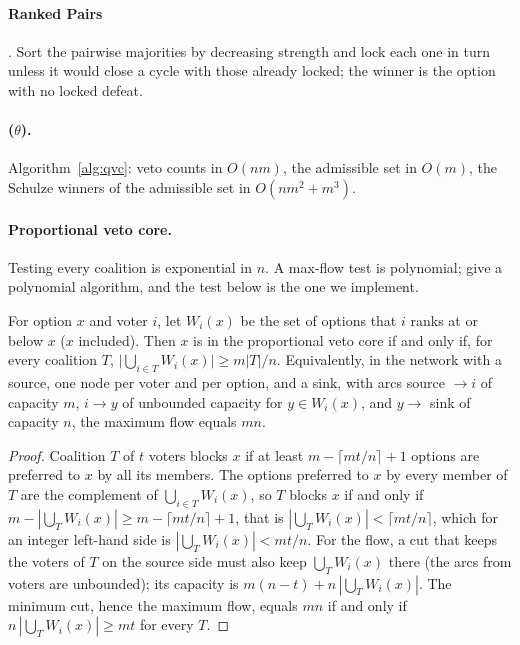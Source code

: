 \paragraph{Ranked Pairs} \citep{Tideman1987}. Sort the pairwise majorities by decreasing strength and lock
each one in turn unless it would close a cycle with those already locked; the winner is the option with no
locked defeat.

\paragraph{\QVC($\theta$).} Algorithm~\ref{alg:qvc}: veto counts in $O(nm)$, the admissible set in $O(m)$,
the Schulze winners of the admissible set in $O(nm^2 + m^3)$.

\paragraph{Proportional veto core.} Testing every coalition is exponential in $n$. A max-flow test is
polynomial; \citet{IanovskiKondratev2021} give a polynomial algorithm, and the test below is the one we
implement.

\begin{lemma}\label{lem:pvc-flow}
For option $x$ and voter $i$, let $W_i(x)$ be the set of options that $i$ ranks at or below $x$ ($x$
included). Then $x$ is in the proportional veto core if and only if, for every coalition $T$,
$\bigl|\bigcup_{i \in T} W_i(x)\bigr| \ge m |T| / n$. Equivalently, in the network with a source, one
node per voter and per option, and a sink, with arcs source $\to i$ of capacity $m$, $i \to y$ of
unbounded capacity for $y \in W_i(x)$, and $y \to$ sink of capacity $n$, the maximum flow equals $mn$.
\end{lemma}

\begin{proof}
Coalition $T$ of $t$ voters blocks $x$ if at least $m - \lceil mt/n \rceil + 1$ options are preferred to
$x$ by all its members. The options preferred to $x$ by every member of $T$ are the complement of
$\bigcup_{i \in T} W_i(x)$, so $T$ blocks $x$ if and only if
$m - |\bigcup_T W_i(x)| \ge m - \lceil mt/n \rceil + 1$, that is
$|\bigcup_T W_i(x)| < \lceil mt/n \rceil$, which for an integer left-hand side is
$|\bigcup_T W_i(x)| < mt/n$. For the flow, a cut that keeps the voters of $T$ on the source side must also
keep $\bigcup_T W_i(x)$ there (the arcs from voters are unbounded); its capacity is
$m(n-t) + n\,|\bigcup_T W_i(x)|$. The minimum cut, hence the maximum flow, equals $mn$ if and only if
$n\,|\bigcup_T W_i(x)| \ge mt$ for every $T$. \qedhere
\end{proof}

